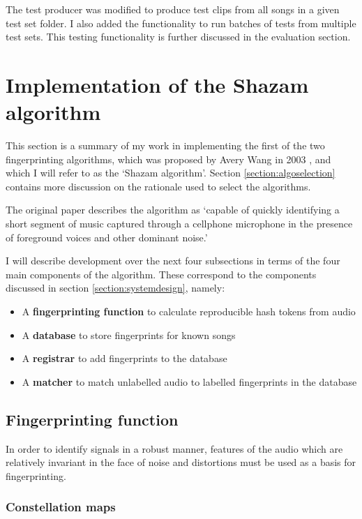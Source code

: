 \documentclass[12pt,a4paper,twoside,openright]{report}
\begin{document}
The test producer was modified to produce test clips from all songs in a given test set folder. I also added the functionality to run batches of tests from multiple test sets. This testing functionality is further discussed in the evaluation section. %



\section{Implementation of the Shazam algorithm}
\label{section:shazam}

This section is a summary of my work in implementing the first of the two fingerprinting algorithms, which was proposed by Avery Wang in 2003 \cite{Wang03}, and which I will refer to as the `Shazam algorithm'. Section \ref{section:algoselection} contains more discussion on the rationale used to select the algorithms.

The original paper describes the algorithm as `capable of quickly identifying a short segment of music captured through a cellphone microphone in the presence of foreground voices and other dominant noise.' %

I will describe development over the next four subsections in terms of the four main components of the algorithm. These correspond to the components discussed in section \ref{section:systemdesign}, namely: 

\begin{itemize}
  \item A \textbf{fingerprinting function} to calculate reproducible hash tokens from audio
  \item A \textbf{database} to store fingerprints for known songs
  \item A \textbf{registrar} to add fingerprints to the database
  \item A \textbf{matcher} to match unlabelled audio to labelled fingerprints in the database
\end{itemize}

\subsection{Fingerprinting function}

In order to identify signals in a robust manner, features of the audio which are relatively invariant in the face of noise and distortions must be used as a basis for fingerprinting.

\subsubsection{Constellation maps}
\end{document}

